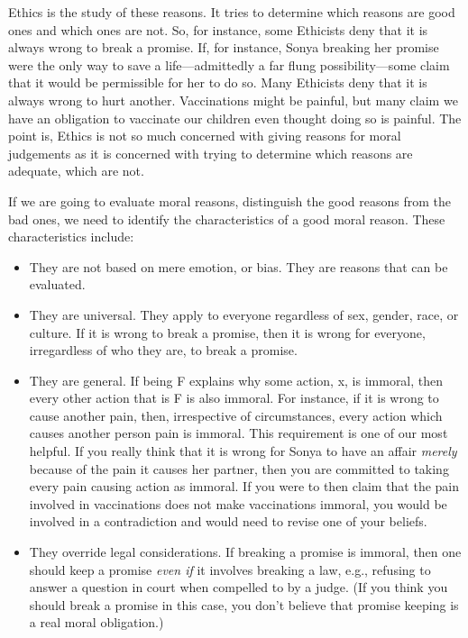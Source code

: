 \documentclass[9pt]{article}
\providecommand{\tightlist}{%
  \setlength{\itemsep}{0pt}\setlength{\parskip}{0pt}}
\begin{document}
Ethics is the study of these reasons. It tries to determine which
reasons are good ones and which ones are not. So, for instance, some
Ethicists deny that it is always wrong to break a promise. If, for
instance, Sonya breaking her promise were the only way to save a
life---admittedly a far flung possibility---some claim that it would be
permissible for her to do so. Many Ethicists deny that it is always
wrong to hurt another. Vaccinations might be painful, but many claim we
have an obligation to vaccinate our children even thought doing so is
painful. The point is, Ethics is not so much concerned with giving
reasons for moral judgements as it is concerned with trying to determine
which reasons are adequate, which are not.

If we are going to evaluate moral reasons, distinguish the good reasons
from the bad ones, we need to identify the characteristics of a good
moral reason. These characteristics include:

\begin{itemize}
\tightlist
\item
  They are not based on mere emotion, or bias. They are reasons that can
  be evaluated.
\item
  They are universal. They apply to everyone regardless of sex, gender,
  race, or culture. If it is wrong to break a promise, then it is wrong
  for everyone, irregardless of who they are, to break a promise.
\item
  They are general. If being F explains why some action, x, is immoral,
  then every other action that is F is also immoral. For instance, if it
  is wrong to cause another pain, then, irrespective of circumstances,
  every action which causes another person pain is immoral. This
  requirement is one of our most helpful. If you really think that it is
  wrong for Sonya to have an affair \emph{merely} because of the pain it
  causes her partner, then you are committed to taking every pain
  causing action as immoral. If you were to then claim that the pain
  involved in vaccinations does not make vaccinations immoral, you would
  be involved in a contradiction and would need to revise one of your
  beliefs.
\item
  They override legal considerations. If breaking a promise is immoral,
  then one should keep a promise \emph{even if} it involves breaking a
  law, e.g., refusing to answer a question in court when compelled to by
  a judge. (If you think you should break a promise in this case, you
  don't believe that promise keeping is a real moral obligation.)
\end{itemize}
\end{document}
